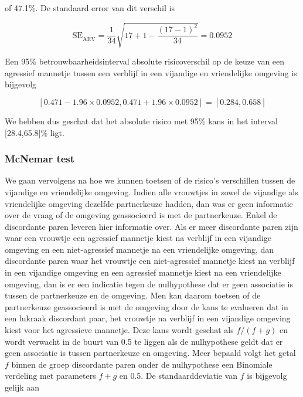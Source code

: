 \documentclass[12pt,dutch,coursenotes]{book}
\theoremstyle{definition}
\theoremstyle{definition}
\theoremstyle{definition}
\theoremstyle{remark}
\begin{document}
of 47.1\%. De standaard error van dit verschil is

\begin{equation*}
\text{SE}_{\widehat{\text{ARV}}}=\frac{1}{34}\sqrt{17+1-\frac{(17-1)^2}{34}}=0.0952
\end{equation*}

Een 95\% betrouwbaarheidsinterval absolute risicoverschil op de keuze
van een agressief mannetje tussen een verblijf in een vijandige en
vriendelijke omgeving is bijgevolg

\begin{equation*}
\left[0.471-1.96\times 0.0952,0.471+1.96\times 0.0952\right]=[0.284,0.658]
\end{equation*}

We hebben dus geschat dat het absolute risico met 95\% kans in het
interval {[}28.4,65.8{]}\% ligt.

\subsubsection{McNemar test}\label{mcnemar-test}

We gaan vervolgens na hoe we kunnen toetsen of de risico's verschillen
tussen de vijandige en vriendelijke omgeving. Indien alle vrouwtjes in
zowel de vijandige als vriendelijke omgeving dezelfde partnerkeuze
hadden, dan was er geen informatie over de vraag of de omgeving
geassocieerd is met de partnerkeuze. Enkel de discordante paren leveren
hier informatie over. Als er meer discordante paren zijn waar een
vrouwtje een agressief mannetje kiest na verblijf in een vijandige
omgeving en een niet-agressief mannetje na een vriendelijke omgeving,
dan discordante paren waar het vrouwtje een niet-agressief mannetje
kiest na verblijf in een vijandige omgeving en een agressief mannetje
kiest na een vriendelijke omgeving, dan is er een indicatie tegen de
nulhypothese dat er geen associatie is tussen de partnerkeuze en de
omgeving. Men kan daarom toetsen of de partnerkeuze geassocieerd is met
de omgeving door de kans te evalueren dat in een lukraak discordant
paar, het vrouwtje na verblijf in een vijandige omgeving kiest voor het
agressieve mannetje. Deze kans wordt geschat als \(f/(f+g)\) en wordt
verwacht in de buurt van 0.5 te liggen als de nulhypothese geldt dat er
geen associatie is tussen partnerkeuze en omgeving. Meer bepaald volgt
het getal \(f\) binnen de groep discordante paren onder de nulhypothese
een Binomiale verdeling met parameters \(f+g\) en 0.5. De
standaarddeviatie van \(f\) is bijgevolg gelijk aan
\end{document}
